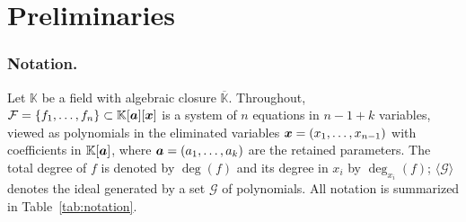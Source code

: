 \section{Preliminaries}\label{Section:Preliminaries}

\subsubsection{Notation.}
Let $\mathbb K$ be a field with algebraic closure
$\overline{\mathbb K}$.
Throughout, $\mathcal{F} = \{f_1, \ldots, f_n\} \subset \mathbb{K}[{\boldsymbol{a}}][{\boldsymbol{x}}]$ is a system of $n$ equations in $n-1+k$ variables, viewed as polynomials in the eliminated variables ${\boldsymbol{x}}=(x_1,\ldots,x_{n-1})$ with coefficients in $\mathbb{K}[{\boldsymbol{a}}]$, where ${\boldsymbol{a}}=(a_1,\ldots,a_k)$ are the retained parameters.
The total degree of $f$ is denoted by $\deg(f)$ and its degree in $x_i$ by $\deg_{x_i}(f)$; $\langle \mathcal{G} \rangle$ denotes the ideal generated by a set $\mathcal{G}$ of polynomials.
All notation is summarized in Table~\ref{tab:notation}.

